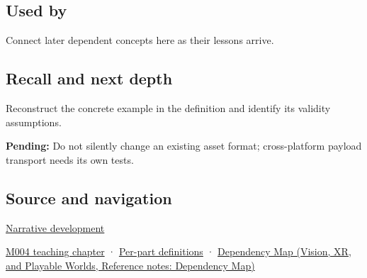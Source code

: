 \subsection{Used by}\label{appendix-e90053a4b201-used-by}

Connect later dependent concepts here as their lessons arrive.

\subsection{Recall and next depth}\label{appendix-e90053a4b201-recall-and-next-depth}

Reconstruct the concrete example in the definition and identify its validity assumptions.

\textbf{Pending:} Do not silently change an existing asset format; cross-platform payload transport needs its own tests.

\subsection{Source and navigation}\label{appendix-e90053a4b201-source-and-navigation}

\hyperref[01-foundations-i-ch001-choosing-what-information-to-keep]{Narrative development}

\hyperref[01-foundations-i-ch001-a-stretching-ruler-for-real-valued-quantities]{M004 teaching chapter} · \hyperref[appendix-fd090d982a15-m004---parts-61-76]{Per-part definitions} · \href{../07-Vision-XR-and-Playable-Worlds/main.pdf\#nameddest=appendix-4ad47bdd269a}{Dependency Map (Vision, XR, and Playable Worlds, Reference notes: Dependency Map)}
